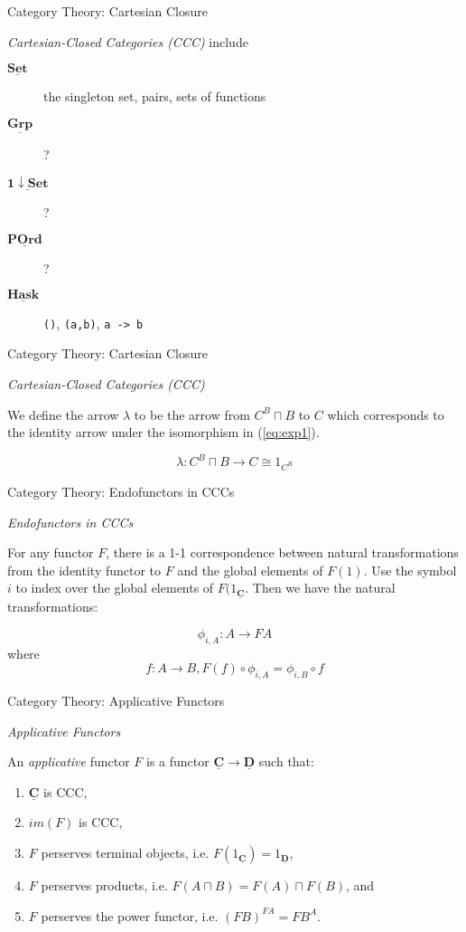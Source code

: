 \documentclass[10pt]{beamer}
\newcommand{\Cat}[1]{\ensuremath{\underline{\mathbf{#1}}}}
\newcommand{\Com}[3]{#3^{#2}}
\newcommand{\eqnref}[1]{(\ref{eq:#1})}
\theoremstyle{definition}
\theoremstyle{remark}
\numberwithin{equation}{section}
\begin{document}
\begin{frame}[fragile]{Category Theory: Cartesian Closure}

  \emph{Cartesian-Closed Categories (CCC)}
  include
  \begin{description}
    \item[\Cat{Set}] the singleton set, pairs, sets of functions
    \item[\Cat{Grp}] ?
    \item[\Cat{1\downarrow Set}] ?
    \item[\Cat{POrd}] ?
    \item[\Cat{Hask}] \lstinline{()}, \lstinline{(a,b)}, \lstinline{a -> b}
  \end{description}

\end{frame}

\begin{frame}[fragile]{Category Theory: Cartesian Closure}

  \emph{Cartesian-Closed Categories (CCC)}

  We define the arrow $\lambda$ to be the arrow from $\Com{C}{B}{C}\sqcap B$ to $C$ which corresponds to the identity arrow under the isomorphism in \eqnref{exp1}.

  \[
  \lambda : \Com{C}{B}{C}\sqcap B \rightarrow C \cong 1_{\Com{C}{B}{C}}
  \]

\end{frame}

\begin{frame}[fragile]{Category Theory: Endofunctors in CCCs}

  \emph{Endofunctors in CCCs}

  For any functor $F$, there is a 1-1 correspondence between natural transformations from the identity functor to $F$ and the global elements of $F(1)$. Use the symbol $i$ to index over the global elements of $F(1_{\Cat{C}}$. Then we have the natural transformations:
  
  \[
  \phi_{i,A} : A \rightarrow F A
  \]
  where
  \[
  f : A \rightarrow B, F(f) \circ \phi_{i,A} = \phi_{i,B} \circ f
  \]

\end{frame}

\begin{frame}[fragile]{Category Theory: Applicative Functors}

  \emph{Applicative Functors}

  An \emph{applicative} functor $F$ is a functor $\Cat{C}\rightarrow \Cat{D}$ such that:
  \begin{enumerate}
    \item $\Cat{C}$ is CCC,
    \item $im(F)$ is CCC,
    \item $F$ perserves terminal objects, i.e. $F(1_{\Cat{C}})=1_{\Cat{D}}$,
    \item $F$ perserves products, i.e. $F(A\sqcap B)=F(A)\sqcap F(B)$, and
    \item $F$ perserves the power functor, i.e. $\Com{D}{F A}{(F B)} = F \Com{C}{A}{B}$.
  \end{enumerate}

\end{frame}
\end{document}
